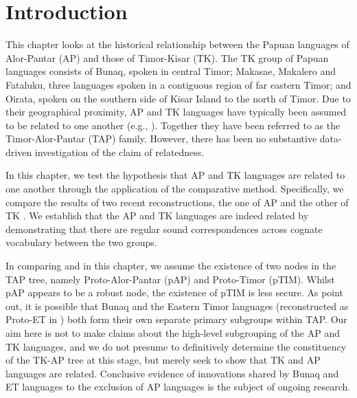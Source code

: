 \section{Introduction}
This chapter looks at the historical relationship between the Papuan languages of Alor-Pantar (AP) and those of Timor-Kisar (TK). The TK group of Papuan languages consists of Bunaq, spoken in central Timor; Makasae, Makalero and Fataluku, three languages spoken in a contiguous region of far eastern Timor; and Oirata, spoken on the southern side of Kisar Island to the north of Timor. Due to their geographical proximity, AP and TK languages have typically been assumed to be related to one another (e.g., \citealt{Stokhof1975,Capell1975}). Together they have been referred to as the Timor-Alor-Pantar (TAP) family. However, there has been no substantive data-driven investigation of the claim of relatedness.

In this chapter, we test the hypothesis that AP and TK languages are related to one another through the application of the comparative method. Specifically, we compare the results of two recent reconstructions, the one of AP \citep{HoltonEtAl2012} and the other of TK \citep{SchapperEtAl2012}. We establish that the AP and TK languages are indeed related by demonstrating that there are regular sound correspondences across cognate vocabulary between the two groups. 

In comparing \citet{HoltonEtAl2012} and \citet{SchapperEtAl2012} in this chapter, we assume the existence of two nodes in the TAP tree, namely Proto-Alor-Pantar (pAP) and Proto-Timor (pTIM). Whilst pAP appears to be a robust node, the existence of pTIM is less secure. As \citet[227-228]{SchapperEtAl2012} point out, it is possible that Bunaq and the Eastern Timor languages (reconstructed as Proto-ET in \citealt{SchapperEtAl2012}) both form their own separate primary subgroups within TAP. Our aim here is not to make claims about the high-level subgrouping of the AP and TK languages, and we do not presume to definitively determine the constituency of the TK-AP tree at this stage, but merely seek to show that TK and AP languages are related. Conclusive evidence of innovations shared by Bunaq and ET languages to the exclusion of AP languages is the subject of ongoing research. 


